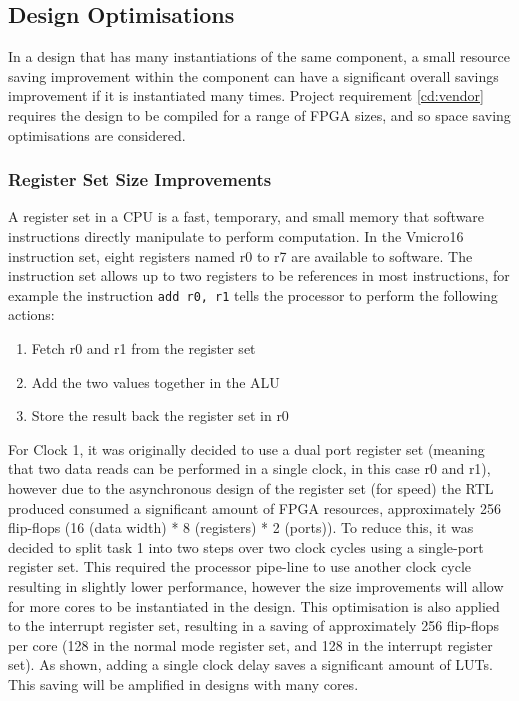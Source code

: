 \subsection{Design Optimisations}
In a design that has many instantiations of the same component, a small resource saving improvement within the component can have a significant overall savings improvement if it is instantiated many times. Project requirement \ref{cd:vendor} requires the design to be compiled for a range of FPGA sizes, and so space saving optimisations are considered. 

\subsubsection{Register Set Size Improvements}
A register set in a CPU is a fast, temporary, and small memory that software instructions directly manipulate to perform computation. In the Vmicro16 instruction set, eight registers named r0 to r7 are available to software. The instruction set allows up to two registers to be references in most instructions, for example the instruction \verb|add r0, r1| tells the processor to perform the following actions:
\begin{enumerate}[leftmargin=4\parindent, label=\bfseries Clock \arabic*.]
\item Fetch r0 and r1 from the register set
\item Add the two values together in the ALU
\item Store the result back the register set in r0
\end{enumerate}
For Clock 1, it was originally decided to use a dual port register set (meaning that two data reads can be performed in a single clock, in this case r0 and r1), however due to the asynchronous design of the register set (for speed) the RTL produced consumed a significant amount of FPGA resources, approximately 256 flip-flops (16 (data width) * 8 (registers) * 2 (ports)). To reduce this, it was decided to split task 1 into two steps over two clock cycles using a single-port register set. This required the processor pipe-line to use another clock cycle resulting in slightly lower performance, however the size improvements will allow for more cores to be instantiated in the design. This optimisation is also applied to the interrupt register set, resulting in a saving of approximately 256 flip-flops per core (128 in the normal mode register set, and 128 in the interrupt register set). As shown, adding a single clock delay saves a significant amount of LUTs. This saving will be amplified in designs with many cores.



